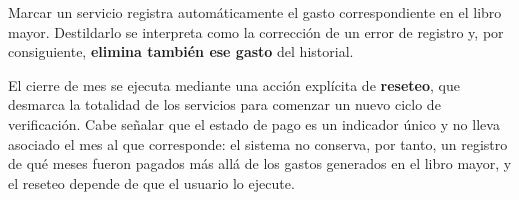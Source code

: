 Marcar un servicio registra automáticamente el gasto correspondiente en el libro mayor. Destildarlo se interpreta como la corrección de un error de registro y, por consiguiente, \textbf{elimina también ese gasto} del historial.

El cierre de mes se ejecuta mediante una acción explícita de \textbf{reseteo}, que desmarca la totalidad de los servicios para comenzar un nuevo ciclo de verificación. Cabe señalar que el estado de pago es un indicador único y no lleva asociado el mes al que corresponde: el sistema no conserva, por tanto, un registro de qué meses fueron pagados más allá de los gastos generados en el libro mayor, y el reseteo depende de que el usuario lo ejecute.